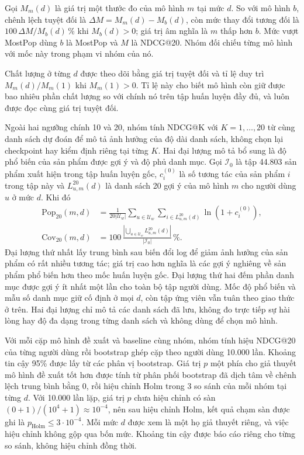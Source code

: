 Gọi $M_m(d)$ là giá trị một thước đo của mô hình $m$ tại mức $d$. So với mô hình $b$, chênh lệch tuyệt đối là $\Delta M=M_m(d)-M_b(d)$, còn mức thay đổi tương đối là $100\,\Delta M/M_b(d)\,\%$ khi $M_b(d)>0$; giá trị âm nghĩa là $m$ thấp hơn $b$. Mức vượt MostPop dùng $b$ là MostPop và $M$ là NDCG@20. Nhóm đối chiếu từng mô hình với mốc này trong phạm vi nhóm của nó.

Chất lượng ở từng $d$ được theo dõi bằng giá trị tuyệt đối và tỉ lệ duy trì $M_m(d)/M_m(1)$ khi $M_m(1)>0$. Tỉ lệ này cho biết mô hình còn giữ được bao nhiêu phần chất lượng so với chính nó trên tập huấn luyện đầy đủ, và luôn được đọc cùng giá trị tuyệt đối.

\label{sec:beyond-accuracy}
Ngoài hai ngưỡng chính 10 và 20, nhóm tính NDCG@K với $K=1,\ldots,20$ từ cùng danh sách dự đoán để mô tả ảnh hưởng của độ dài danh sách, không chọn lại checkpoint hay kiểm định riêng tại từng $K$. Hai đại lượng mô tả bổ sung là độ phổ biến của sản phẩm được gợi ý và độ phủ danh mục. Gọi $\mathcal{I}_0$ là tập 44.803 sản phẩm xuất hiện trong tập huấn luyện gốc, $c_i^{(0)}$ là số tương tác của sản phẩm $i$ trong tập này và $L_{u,m}^{20}(d)$ là danh sách 20 gợi ý của mô hình $m$ cho người dùng $u$ ở mức $d$. Khi đó
\begin{align}
\mathrm{Pop}_{20}(m,d)
&=\frac{1}{20|\mathcal{U}_w|}\sum_{u\in\mathcal{U}_w}\sum_{i\in L_{u,m}^{20}(d)}\ln(1+c_i^{(0)}),
\label{eq:recommendation-popularity}\\
\mathrm{Cov}_{20}(m,d)
&=100\,\frac{\left|\bigcup_{u\in\mathcal{U}_w}L_{u,m}^{20}(d)\right|}{|\mathcal{I}_0|}\,\%.
\label{eq:catalog-coverage}
\end{align}
Đại lượng thứ nhất lấy trung bình sau biến đổi log để giảm ảnh hưởng của sản phẩm có rất nhiều tương tác; giá trị cao hơn nghĩa là các gợi ý nghiêng về sản phẩm phổ biến hơn theo mốc huấn luyện gốc. Đại lượng thứ hai đếm phần danh mục được gợi ý ít nhất một lần cho toàn bộ tập người dùng. Mốc độ phổ biến và mẫu số danh mục giữ cố định ở mọi $d$, còn tập ứng viên vẫn tuân theo giao thức ở trên. Hai đại lượng chỉ mô tả các danh sách đã lưu, không đo trực tiếp sự hài lòng hay độ đa dạng trong từng danh sách và không dùng để chọn mô hình.

\label{sec:statistical-protocol}

Với mỗi cặp mô hình đề xuất và baseline cùng nhóm, nhóm tính hiệu NDCG@20 của từng người dùng rồi bootstrap ghép cặp theo người dùng 10.000 lần. Khoảng tin cậy 95\% được lấy từ các phân vị bootstrap. Giá trị $p$ một phía cho giả thuyết mô hình đề xuất tốt hơn được tính từ phân phối bootstrap đã dịch tâm về chênh lệch trung bình bằng 0, rồi hiệu chỉnh Holm trong 3 so sánh của mỗi nhóm tại từng $d$. Với 10.000 lần lặp, giá trị $p$ chưa hiệu chỉnh có sàn $(0+1)/(10^4+1)\approx10^{-4}$, nên sau hiệu chỉnh Holm, kết quả chạm sàn được ghi là $p_{\mathrm{Holm}}\le3\cdot10^{-4}$. Mỗi mức $d$ được xem là một họ giả thuyết riêng, và việc hiệu chỉnh không gộp qua bốn mức. Khoảng tin cậy được báo cáo riêng cho từng so sánh, không hiệu chỉnh đồng thời.

